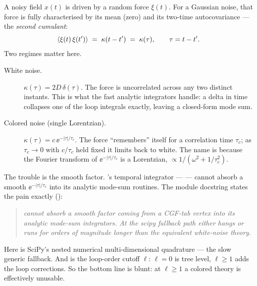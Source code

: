 A noisy field $x(t)$ is driven by a random force $\xi(t)$. For a Gaussian noise,
that force is fully characterised by its mean (zero) and its two-time
autocovariance --- the \emph{second cumulant}:
\begin{equation}
  \left\langle \xi(t)\,\xi(t') \right\rangle \;=\; \kappa(t-t') \;=\; \kappa(\tau),
  \qquad \tau = t - t'.
  \label{eq:cm-secondcumulant}
\end{equation}
Two regimes matter here.

\begin{description}
  \item[White noise.] $\kappa(\tau) = 2D\,\delta(\tau)$. The force is
        uncorrelated across any two distinct instants. This is what the fast
        analytic integrators handle: a delta in time collapses one of the loop
        integrals exactly, leaving a closed-form mode sum.
  \item[Colored noise (single Lorentzian).] $\kappa(\tau) = c\,\ee^{-|\tau|/\tau_c}$.
        The force ``remembers'' itself for a correlation time $\tau_c$; as
        $\tau_c \to 0$ with $c/\tau_c$ held fixed it limits back to white. The
        name  is because the Fourier transform of
        $\ee^{-|\tau|/\tau_c}$ is a Lorentzian, $\propto 1/(\omega^2 + 1/\tau_c^2)$.
\end{description}

The trouble is the smooth factor. \Daedalus's temporal integrator ---
 --- cannot absorb a smooth
$\ee^{-|\tau|/\tau_c}$ into its analytic mode-sum routines. The module docstring
states the pain exactly ():

\begin{quote}\itshape
{} cannot absorb a smooth
 factor coming from a CGF-tab 
vertex into its analytic mode-sum integrators. At  the scipy
 fallback path either hangs or runs for orders of magnitude longer
than the equivalent white-noise theory.
\end{quote}

Here  is SciPy's nested numerical multi-dimensional quadrature --- the
slow generic fallback. And  is the loop-order cutoff $\ell$:
$\ell = 0$ is tree level, $\ell \ge 1$ adds the loop corrections. So the bottom
line is blunt: at $\ell \ge 1$ a colored theory is effectively unusable.

